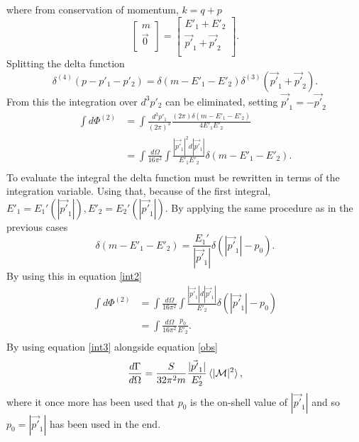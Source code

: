 where from conservation of momentum, $k=q+p$
\begin{equation}
	\begin{bmatrix}
		m \\ \vec{0} \\
	\end{bmatrix}= \begin{bmatrix}
	E'_1+E'_2 \\ \vec{p'}_1+\vec{p'}_2\\
\end{bmatrix}.
\end{equation} 
Splitting the delta function
\begin{equation}
	\delta^{(4)}(p-p'_1-p'_2)=\delta(m-E'_1-E'_2)\delta^{(3)}(\vec{p'}_1+\vec{p'}_2).
\end{equation} 
From this the integration over $d^3p'_2$ can be eliminated, setting $\vec{p'}_1=-\vec{p'}_2$
\begin{equation}
	\begin{split}
		\int d\Phi^{(2)}&=\int\frac{d^3p'_1}{(2\pi)^3}\frac{(2\pi)\delta(m-E'_1-E'_2)}{4E'_{1}E'_{2}}\\
		&=\int \frac{d\Omega}{16\pi^2}\int \frac{|\vec{p'}_1|^2d|\vec{p'}_1|}{E'_{1}E'_{2}}\delta(m-E'_1-E'_2).\\
	\end{split}
	\label{int2}
\end{equation} 
To evaluate the integral the delta function must be rewritten in terms of the integration variable. Using that, because of the first integral, $E'_1=E_1'(|\vec{p'}_1|), E'_2=E_2'(|\vec{p'}_1|)$. By applying the same procedure as in the previous cases
\begin{equation}
	\delta(m-E'_1-E'_2)=\frac{E_1'}{|\vec{p'}_1|}\delta(|\vec{p'}_1|-p_0).
\end{equation} 
By using this in equation \ref{int2}
\begin{equation}
	\begin{split}
		\int d\Phi^{(2)}&=\int \frac{d\Omega}{16\pi^2}\int \frac{|\vec{p'}_1|d|\vec{p'}_1|}{E'_{2}}\delta(|\vec{p'}_1|-p_0)\\
		&=\int \frac{d\Omega}{16\pi^2}\frac{p_0}{E'_{2}}.\\
	\end{split}
	\label{int3}
\end{equation} 
By using equation \eqref{int3} alongside equation \eqref{obs}
\begin{equation}
	\frac{d\Gamma}{d\Omega}=\frac{S}{32\pi^2m}\frac{|\vec{p'}_1|}{E'_{2}}\braket{|\mathcal{M}|^2},
\end{equation} 
where it once more has been used that $p_0$ is the on-shell value of $|\vec{p'}_1|$ and so $p_0=|\vec{p'}_1|$ has been used in the end.

